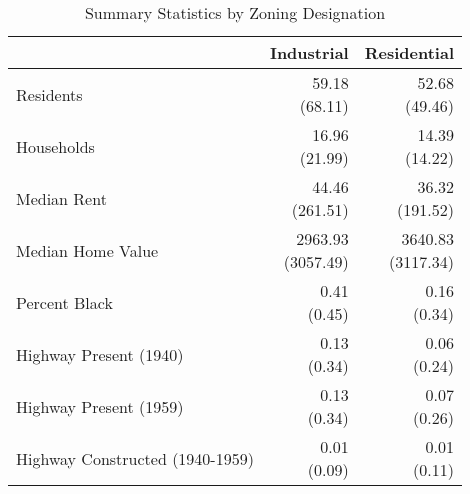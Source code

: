\begin{table}[h]
\centering
\caption{Summary Statistics by Zoning Designation}
\label{tab:summary_stats_zone}
\begin{tabular*}{\linewidth}{@{\extracolsep{\fill}}l*{2}{r}}
\toprule
 & Industrial & Residential \\
\midrule
Residents & \makecell[tr]{59.18 \\ (68.11)} & \makecell[tr]{52.68 \\ (49.46)} \\
Households & \makecell[tr]{16.96 \\ (21.99)} & \makecell[tr]{14.39 \\ (14.22)} \\
Median Rent & \makecell[tr]{44.46 \\ (261.51)} & \makecell[tr]{36.32 \\ (191.52)} \\
Median Home Value & \makecell[tr]{2963.93 \\ (3057.49)} & \makecell[tr]{3640.83 \\ (3117.34)} \\
Percent Black & \makecell[tr]{0.41 \\ (0.45)} & \makecell[tr]{0.16 \\ (0.34)} \\
Highway Present (1940) & \makecell[tr]{0.13 \\ (0.34)} & \makecell[tr]{0.06 \\ (0.24)} \\
Highway Present (1959) & \makecell[tr]{0.13 \\ (0.34)} & \makecell[tr]{0.07 \\ (0.26)} \\
Highway Constructed (1940-1959) & \makecell[tr]{0.01 \\ (0.09)} & \makecell[tr]{0.01 \\ (0.11)} \\
\bottomrule
\end{tabular*}
\end{table}
